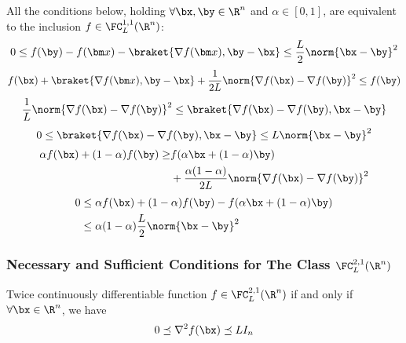 \begin{theorem}
    All the conditions below, holding $\forall \bx,\by\in\R^n$ and $\alpha\in[0,1]$, are equivalent to the inclusion $f\in\FC_L^{1,1}(\R^n)$:
    \begin{equation}
        0\le f(\by)-f(\bm x)-\braket{\nabla f(\bm x),\by-\bx}\le \frac{L}{2}\norm{\bx-\by}^2
    \end{equation}
    \begin{equation}
        f(\bx)+\braket{\nabla f(\bm x),\by-\bx}+\frac{1}{2L}\norm{\nabla f(\bx)-\nabla f(\by)}^2\le f(\by) 
    \end{equation}
    \begin{equation}
        \frac{1}{L}\norm{\nabla f(\bx)-\nabla f(\by)}^2\le \braket{\nabla f(\bx)-\nabla f(\by), \bx-\by}
    \end{equation}
    \begin{equation}
        0\le  \braket{\nabla f(\bx)-\nabla f(\by), \bx-\by} \le L\norm{\bx-\by}^2
    \end{equation}
    \begin{equation}
        \begin{aligned}
            \alpha f(\bx)+(1-\alpha)f(\by)\ge& f(\alpha \bx+(1-\alpha)\by)\\
            &+\frac{\alpha(1-\alpha)}{2L}\norm{\nabla f(\bx)-\nabla f(\by)}^2 
        \end{aligned}
    \end{equation}
    \begin{equation}
        \begin{aligned}
            0&\le \alpha f(\bx)+(1-\alpha)f(\by)- f(\alpha \bx+(1-\alpha)\by)\\
            &\le \alpha(1-\alpha)\frac{L}{2}\norm{\bx-\by}^2
        \end{aligned}
    \end{equation}
\end{theorem}



\subsubsection{Necessary and Sufficient Conditions for The Class \texorpdfstring{$\FC_L^{2,1}(\R^n)$}. }

\begin{theorem}
    Twice continuously differentiable function $f\in \FC_L^{2,1}(\R^n)$ if and only if $\forall \bx \in \R^n$, we have
    \begin{align*}
        0\preceq \nabla^2 f(\bx)\preceq LI_n
    \end{align*}
\end{theorem}

